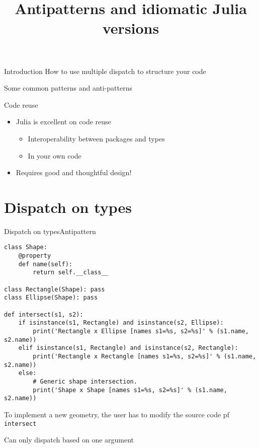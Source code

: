 

\title{Antipatterns and idiomatic Julia versions}

\maketitle

\begin{frame}{Introduction}{}
    How to use multiple dispatch to structure your code

    Some common patterns and anti-patterns
    \pause
    \begin{block}{Code reuse}
        \begin{itemize}
            \item Julia is excellent on code reuse
            \begin{itemize}
                \item Interoperability between packages and types
                \item In your own code
            \end{itemize}
            \item Requires good and thoughtful design!
        \end{itemize}
    \end{block}

\end{frame}



\section{Dispatch on types}

\begin{frame}[fragile]{Dispatch on types}{Antipattern}

    \begin{verbatim}
class Shape:
    @property
    def name(self):
        return self.__class__

class Rectangle(Shape): pass
class Ellipse(Shape): pass

def intersect(s1, s2):
    if isinstance(s1, Rectangle) and isinstance(s2, Ellipse):
        print('Rectangle x Ellipse [names s1=%s, s2=%s]' % (s1.name, s2.name))
    elif isinstance(s1, Rectangle) and isinstance(s2, Rectangle):
        print('Rectangle x Rectangle [names s1=%s, s2=%s]' % (s1.name, s2.name))
    else:
        # Generic shape intersection.
        print('Shape x Shape [names s1=%s, s2=%s]' % (s1.name, s2.name))
    \end{verbatim}
     To implement a new geometry, the user has to
modify the source code pf \texttt{intersect}

\vspace{3mm}
Can only dispatch based on one argument
\end{frame}


